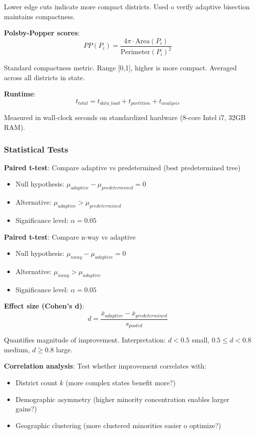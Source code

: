 Lower edge cuts indicate more compact districts. Used 	o verify adaptive bisection maintains compactness.

\textbf{Polsby-Popper scores}:
\begin{equation}
PP(P_i) = \frac{4\pi \cdot \text{Area}(P_i)}{\text{Perimeter}(P_i)^2}
\end{equation}

Standard compactness metric. Range [0,1], higher is more compact. Averaged across all districts in state.

\textbf{Runtime}:
\begin{equation}
t_{total} = t_{data\_load} + t_{partition} + t_{analysis}
\end{equation}

Measured in wall-clock seconds on standardized hardware (8-core Intel i7, 32GB RAM).

\subsubsection{Statistical Tests}

\textbf{Paired t-test}: Compare adaptive vs predetermined (best predetermined tree)
\begin{itemize}
\item Null hypothesis: $\mu_{adaptive} - \mu_{predetermined} = 0$
\item Alternative: $\mu_{adaptive} > \mu_{predetermined}$
\item Significance level: $\alpha = 0.05$
\end{itemize}

\textbf{Paired t-test}: Compare n-way vs adaptive
\begin{itemize}
\item Null hypothesis: $\mu_{nway} - \mu_{adaptive} = 0$
\item Alternative: $\mu_{nway} > \mu_{adaptive}$
\item Significance level: $\alpha = 0.05$
\end{itemize}

\textbf{Effect size (Cohen's d)}:
\begin{equation}
d = \frac{\bar{x}_{adaptive} - \bar{x}_{predetermined}}{s_{pooled}}
\end{equation}

Quantifies magnitude of improvement. Interpretation: $d < 0.5$ small, $0.5 \leq d < 0.8$ medium, $d \geq 0.8$ large.

\textbf{Correlation analysis}: Test whether improvement correlates with:
\begin{itemize}
\item District count $k$ (more complex states benefit more?)
\item Demographic asymmetry (higher minority concentration enables larger gains?)
\item Geographic clustering (more clustered minorities easier 	o optimize?)
\end{itemize}

